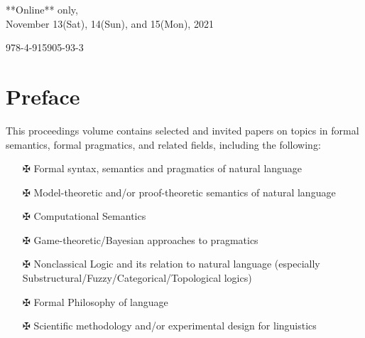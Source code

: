 \documentclass[12pt]{jarticle}
\begin{document}
\vspace*{1cm}
\begin{large}
\begin{center}
**Online** only, \\
November 13(Sat), 14(Sun), and 15(Mon), 2021
\end{center}
\end{large}
\vfill

\newpage

\vspace*{20cm}
\vfill
\begin{large}
978-4-915905-93-3
\end{large}

\newpage
\pagestyle{plain}

\newpage
\section*{Preface}


This proceedings volume contains selected and invited papers on topics in formal semantics, formal pragmatics, and related fields, including the following:
\begin{itemize}
\item[$\maltese$] Formal syntax, semantics and pragmatics of natural language
\item[$\maltese$] Model-theoretic and/or proof-theoretic semantics of natural language
\item[$\maltese$] Computational Semantics
\item[$\maltese$] Game-theoretic/Bayesian approaches to pragmatics
\item[$\maltese$] Nonclassical Logic and its relation to natural language (especially Substructural/Fuzzy/Categorical/Topological logics)
\item[$\maltese$] Formal Philosophy of language
\item[$\maltese$] Scientific methodology and/or experimental design for linguistics
\end{itemize}



\vspace*{2.5cm}
\end{document}
